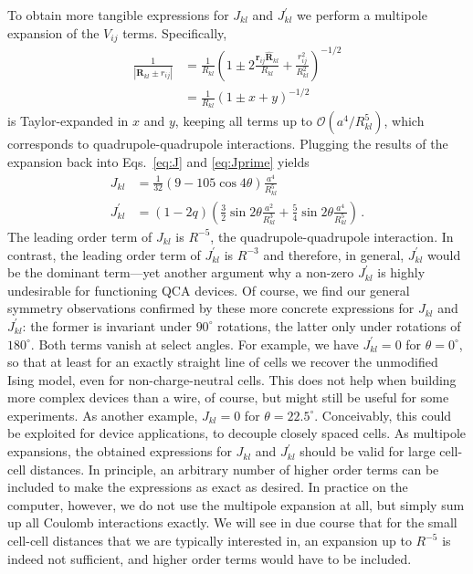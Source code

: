 To obtain more tangible expressions for $J_{kl}$ and $J^{\prime}_{kl}$ we
perform a multipole expansion of the $V_{ij}$ terms. Specifically,
%
\begin{equation}
\begin{split}
  \frac{1}{\left| \bm{R}_{kl} \pm r_{ij} \right|}
  &=
  \frac{1}{R_{kl}}
  \left( 
  1 \pm 2 \frac{\bm{r}_{ij} \hat{\bm{R}}_{kl}}{R_{kl}} + \frac{r_{ij}^2}{R_{kl}^2}
  \right)^{-1/2} \\
  &=
  \frac{1}{R_{kl}} \left( 1 \pm x + y \right)^{-1/2}
\end{split}
\end{equation}
%
is Taylor-expanded in $x$ and $y$, keeping all terms up to
$\mathcal{O}\left(a^4 / R_{kl}^5\right)$, which corresponds to
quadrupole-quadrupole interactions. Plugging the results of the expansion back
into Eqs.~\eqref{eq:J} and \eqref{eq:Jprime} yields
%
\begin{align}
  \label{eq:J_}
  J_{kl}
  &=
  \frac{ 1 }{ 32 }
  \left(
    9 - 105 \cos{4 \theta}
  \right)
  \frac{ a^4 }{ R_{kl}^5 }
  \\
  \label{eq:Jprime_}
  J^{\prime}_{kl}
  &=
  \left( 1 - 2 q \right)
  \left(
    \frac{ 3 }{ 2 } \sin{2 \theta} \frac{ a^2 }{ R_{kl}^3 } +
    \frac{ 5 }{ 4 } \sin{2 \theta} \frac{ a^4 }{ R_{kl}^5 }
  \right) \, .
\end{align}
%
The leading order term of $J_{kl}$ is $R^{-5}$, the quadrupole-quadrupole
interaction. In contrast, the leading order term of $J^{\prime}_{kl}$ is
$R^{-3}$ and therefore, in general, $J^{\prime}_{kl}$ would be the dominant
term---yet another argument why a non-zero $J^{\prime}_{kl}$ is highly
undesirable for functioning QCA devices. Of course, we find our general symmetry
observations confirmed by these more concrete expressions for $J_{kl}$ and
$J^{\prime}_{kl}$: the former is invariant under $90^{\circ}$ rotations, the
latter only under rotations of $180^{\circ}$. Both terms vanish at select
angles. For example, we have $J^{\prime}_{kl} = 0$ for $\theta = 0^{\circ}$, so
that at least for an exactly straight line of cells we recover the unmodified
Ising model, even for non-charge-neutral cells. This does not help when building
more complex devices than a wire, of course, but might still be useful for some
experiments. As another example, $J_{kl} = 0$ for $\theta = 22.5^{\circ}$.
Conceivably, this could be exploited for device applications, to decouple
closely spaced cells. As multipole expansions, the obtained expressions for
$J_{kl}$ and $J^{\prime}_{kl}$ should be valid for large cell-cell distances. In
principle, an arbitrary number of higher order terms can be included to make the
expressions as exact as desired. In practice on the computer, however, we do not
use the multipole expansion at all, but simply sum up all Coulomb interactions
exactly. We will see in due course that for the small cell-cell distances that
we are typically interested in, an expansion up to $R^{-5}$ is indeed not
sufficient, and higher order terms would have to be included.

